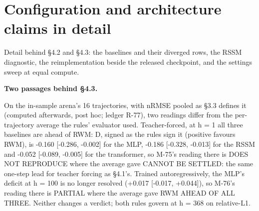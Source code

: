 \documentclass[10pt]{article}
\begin{document}
\section{Configuration and architecture claims in detail}

Detail behind \S{}4.2 and \S{}4.3: the baselines and their diverged rows, the RSSM diagnostic, the reimplementation beside the released checkpoint, and the settings sweep at equal compute.

\textbf{Two passages behind \S{}4.3.}

On the in-sample arena's 16 trajectories, with nRMSE pooled as \S{}3.3 defines it (computed afterwards, post hoc; ledger R-77), two readings differ from the per-trajectory average the rules' evaluator used. Teacher-forced, at h = 1 all three baselines are ahead of RWM: D, signed as the rules sign it (positive favours RWM), is -0.160 [-0.286, -0.002] for the MLP, -0.186 [-0.328, -0.013] for the RSSM and -0.052 [-0.089, -0.005] for the transformer, so M-75's reading there is DOES NOT REPRODUCE where the average gave CANNOT BE SETTLED: the same one-step lead for teacher forcing as \S{}4.1's. Trained autoregressively, the MLP's deficit at h = 100 is no longer resolved (+0.017 [-0.017, +0.044]), so M-76's reading there is PARTIAL where the average gave RWM AHEAD OF ALL THREE. Neither changes a verdict; both rules govern at h = 368 on relative-L1.
\end{document}
